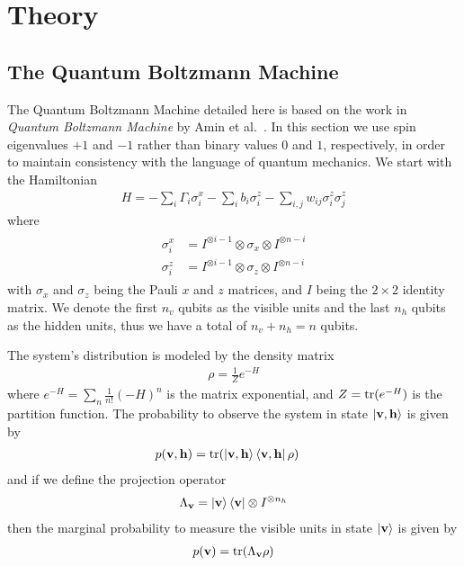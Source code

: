 \section{Theory}
\subsection{The Quantum Boltzmann Machine}
The Quantum Boltzmann Machine detailed here is based on the work in \textit{Quantum Boltzmann Machine} by Amin et al.~\cite{amin_2018}.
In this section we use spin eigenvalues \( +1 \) and \( -1 \) rather than binary values \( 0 \) and \( 1 \), respectively, in order to maintain consistency with the language of quantum mechanics.
We start with the Hamiltonian
\begin{align}
    H = -\sum_i \Gamma_i \sigma_i^x -\sum_i b_i \sigma_i^z - \sum_{i,j} w_{ij} \sigma_i^z \sigma_j^z
\end{align}
where
\begin{align}
\begin{split}
    \sigma_i^x
        &= I^{\otimes i-1} \otimes \sigma_x \otimes I^{\otimes n-i} \\
    \sigma_i^z
        &= I^{\otimes i-1} \otimes \sigma_z \otimes I^{\otimes n-i}
\end{split}
\end{align}
with \( \sigma_x \) and \( \sigma_z \) being the Pauli \( x \) and \( z \) matrices, and \( I \) being the \( 2 \times 2 \) identity matrix.
We denote the first \( n_v \) qubits as the visible units and the last \( n_h \) qubits as the hidden units, thus we have a total of \( n_v + n_h = n \) qubits.

The system's distribution is modeled by the density matrix
\begin{align}
    \rho = \frac{1}{Z} e^{-H}
\label{eq:density_operator}
\end{align}
where \( e^{-H} = \sum_n \frac{1}{n!} (-H)^n \) is the matrix exponential, and \( Z = \text{tr}(e^{-H}) \) is the partition function.
The probability to observe the system in state \( \ket{\mathbf{v},\mathbf{h}} \) is given by
\begin{align}
    p(\mathbf{v},\mathbf{h})
        &= \text{tr}(\ket{\mathbf{v},\mathbf{h}}\bra{\mathbf{v},\mathbf{h}} \rho)
\end{align}
and if we define the projection operator
\begin{align}
    \Lambda_{\mathbf{v}} = \ket{\mathbf{v}}\bra{\mathbf{v}} \otimes I^{\otimes n_h}
\end{align}
then the marginal probability to measure the visible units in state \( \ket{\mathbf{v}} \) is given by
\begin{align}
    p(\mathbf{v}) = \text{tr}(\Lambda_{\mathbf{v}}\rho)
\end{align}

